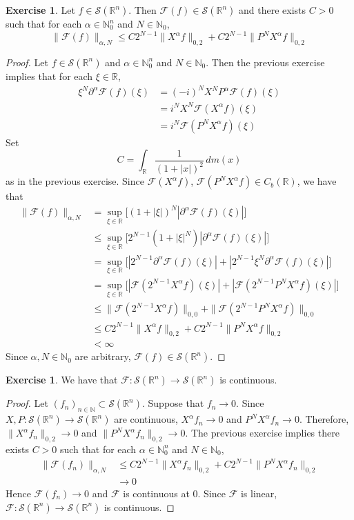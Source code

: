 \documentclass{book}
\theoremstyle{definition}
\newtheorem{ex}[definition]{Exercise}
\newcommand{\al}{\alpha}
\newcommand{\N}{\mathbb{N}}
\newcommand{\R}{\mathbb{R}}
\newcommand{\MF}{\mathcal{F}}
\newcommand{\MS}{\mathcal{S}}
\DeclareMathOperator*{\0}{\mbf{0}}
\DeclareMathOperator*{\1}{\mbf{1}}
\newcommand{\p}{\partial}
\newcommand{\dm}{\, d m}
\begin{document}
	\begin{ex}
		Let $f \in \MS(\R^n)$. Then $\MF(f) \in \MS(\R^n)$ and there exists $C>0$ such that for each $\al \in \N_0^n$ and $N \in \N_0$, 
		$$ \|\MF(f)\|_{\al, N} \leq C2^{N-1}\| X^{\al} f \|_{0,2} +  C2^{N-1}\|  P^N X^{\al} f\|_{0,2} $$
	\end{ex}

	\begin{proof}
		Let $f \in \MS(\R^n)$ and $\al \in \N_0^n$ and $N \in \N_0$. Then the previous exercise implies that for each $\xi \in \R$,
		\begin{align*}
			\xi^{N}\p^{\al} \MF(f)(\xi)
			& = (-i)^{N} X^{N} P^{\al} \MF(f)(\xi) \\
			&= i^{N} X^N \MF(X^{\al} f)(\xi) \\
			&= i^{N} \MF(P^{N} X^{\al} f)(\xi) 
		\end{align*}
		Set 
		$$C = \int_{\R} \frac{1}{(1+|x|)^2} \dm(x)$$ 
		as in the previous exercise. Since $\MF(X^{\al}f)$, $\MF(P^NX^{\al}f) \in C_b(\R)$, we have that
		\begin{align*}
			\|\MF(f)\|_{\al, N}
			& = \sup_{\xi \in \R} \bigg[ (1 + |\xi|)^N |\p^{\al} \MF(f)(\xi)|\bigg] \\
			& \leq \sup_{\xi \in \R} \bigg[ 2^{N-1}(1 + |\xi|^N) |\p^{\al} \MF(f)(\xi)| \bigg] \\
			& = \sup_{\xi \in \R} \bigg[ |2^{N-1} \p^{\al} \MF(f)(\xi)| + |2^{N-1}\xi^N \p^{\al} \MF(f)(\xi)| \bigg] \\
			& = \sup_{\xi \in \R} \bigg[  |\MF( 2^{N-1} X^{\al} f)(\xi)| + |\MF(2^{N-1} P^N X^{\al} f)(\xi)| \bigg] \\
			& \leq  \| \MF( 2^{N-1} X^{\al} f) \|_{0,0} + \| \MF(2^{N-1} P^N X^{\al} f)\|_{0,0} \\
			& \leq C2^{N-1}\| X^{\al} f \|_{0,2} +  C2^{N-1}\|  P^N X^{\al} f\|_{0,2} \\
			& < \infty
		\end{align*}
		Since $\al, N \in \N_0$ are arbitrary, $\MF(f) \in \MS(\R^n)$.
	\end{proof}

	\begin{ex}
		We have that $\MF: \MS(\R^n) \rightarrow \MS(\R^n)$ is continuous. 
	\end{ex}

	\begin{proof}
		Let $(f_n)_{n \in \N} \subset \MS(\R^n)$. Suppose that $f_n \rightarrow 0$. Since $X,P: \MS(\R^n) \rightarrow \MS(\R^n)$ are continuous, $X^{\al}f_n \rightarrow 0$ and $P^NX^\al f_n \rightarrow 0$. Therefore, $\|X^{\al}f_n\|_{0, 2} \rightarrow 0$ and $\|P^NX^{\al}f_n\|_{0, 2} \rightarrow 0$. The previous exercise implies there exists $C >0$ such that for each $\al \in \N_0^n$ and $N \in \N_0$, 
		\begin{align*}
			\|\MF(f_n)\|_{\al, N} 
			& \leq C2^{N-1}\| X^{\al} f_n \|_{0,2} +  C2^{N-1}\|  P^N X^{\al} f_n \|_{0,2} \\
			& \rightarrow 0
		\end{align*}
		Hence $\MF(f_n) \rightarrow 0$ and $\MF$ is continuous at $0$. Since $\MF$ is linear, $\MF: \MS(\R^n) \rightarrow \MS(\R^n)$ is continuous. 
	\end{proof}
\end{document}
